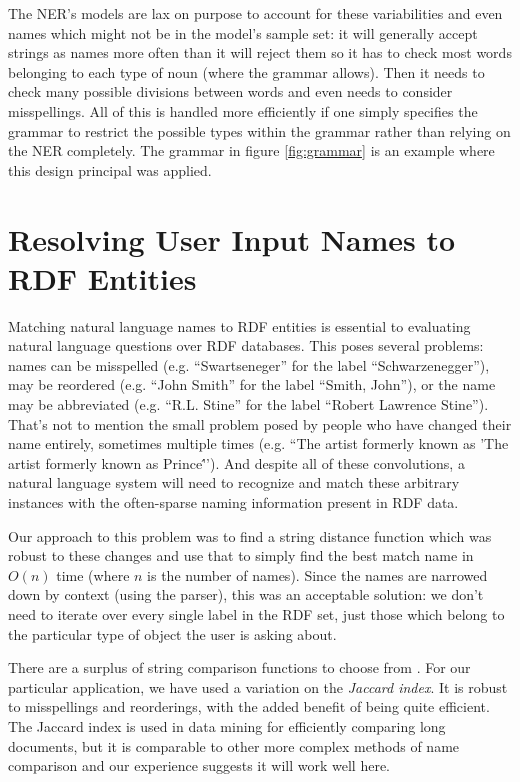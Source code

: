 \documentclass[11pt]{article}
\begin{document}
{The NER's models are lax on purpose to account for these variabilities and
even names which might not be in the model's sample set: it will generally accept
strings as names more often than it will reject them so it has to check most words
belonging to each type of noun (where the grammar allows). Then it needs to check many 
possible divisions between words and even needs to consider misspellings. All of this is handled more 
efficiently if one simply specifies the grammar to restrict the possible types 
within the grammar rather than relying on the NER completely. The grammar
in figure \ref{fig:grammar} is an example where this design principal was applied.


\section{Resolving User Input Names to RDF Entities}

Matching natural language names to RDF entities is essential to evaluating
natural language questions over RDF databases. This poses several problems:
names can be misspelled (e.g. ``Swartseneger'' for the label ``Schwarzenegger''), 
may be reordered (e.g. ``John Smith'' for the label ``Smith, John''),
or the name may be abbreviated (e.g. ``R.L. Stine'' for the label ``Robert Lawrence Stine'').
That's not to mention the small problem posed by people who have
changed their name entirely, sometimes multiple times
(e.g. ``The artist formerly known as 'The artist formerly known as Prince\''').
And despite all of these convolutions, a natural language system will need to
recognize and match these arbitrary instances with the often-sparse naming information
present in RDF data.

Our approach to this problem was to find a string distance function which was
robust to these changes and use that to simply find the best match name in $O(n)$ time 
(where $n$ is the number of names). Since the names are narrowed down by
context (using the parser), this was an acceptable solution: we don't need to iterate
over every single label in the RDF set, just those which belong to the particular
type of object the user is asking about.

There are a surplus of string comparison functions to choose from \cite{comparison}.
For our particular application, we have used a variation on the {\em Jaccard index}.
It is robust to misspellings and reorderings, with the added benefit of being quite efficient.
The Jaccard index is used in data mining for efficiently comparing long documents,
but it is comparable to other more complex methods of name comparison \cite{comparison} and 
our experience suggests it will work well here.

}
\end{document}
